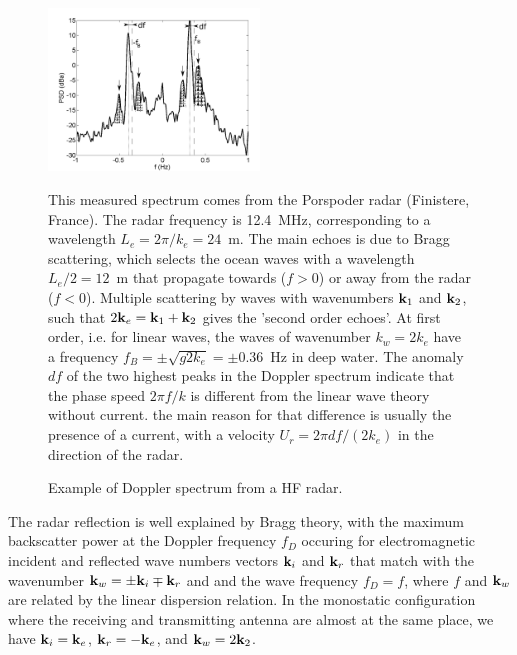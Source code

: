\begin{figure}[htb]
\centerline{\includegraphics[width=0.5\textwidth]{FIGS_CH_MEASUREMENTS/Spectre_bin_10_touch.png}}
  \caption{Example of Doppler spectrum from a HF radar.}{This measured spectrum comes from the Porspoder radar (Finistere, France). 
The radar frequency is 12.4~MHz, corresponding to a wavelength $L_e=2 \pi/k_e=24$~m. The main echoes is due to Bragg scattering, 
which selects the ocean waves with a wavelength $L_e/2=12$~m that propagate towards ($f > 0$)  or away from the radar ($f<0$). 
Multiple scattering by waves with wavenumbers  $\mathbf{k}_1$ and $\mathbf{k}_2$, such that $2 \mathbf{k}_e = \mathbf{k}_1 + \mathbf{k}_2$
gives the 'second order echoes'. At first order, i.e. for linear waves, the waves of wavenumber $k_w=2 k_e$ 
have a frequency $f_B=\pm \sqrt{g 2 k_e} =\pm 0.36$~Hz  in deep water. The anomaly $df$ of the two highest peaks in the Doppler spectrum 
indicate that the phase speed $2 \pi f / k$ is different from the linear wave theory without current. 
the main reason for that difference is usually the presence of a current, with a velocity $U_r=2 \pi df / (2 k_e)$ in the direction of the radar. }\label{HFspectrum}
\end{figure}

The radar reflection is well explained by Bragg theory, with the maximum backscatter power at the Doppler frequency $f_D$ occuring for 
electromagnetic incident and reflected wave numbers vectors $\mathbf{k}_i$ and $\mathbf{k}_r$ that match with the wavenumber $\mathbf{k}_w = \pm \mathbf{k}_i \mp \mathbf{k}_r$ 
and and the wave frequency $f_D=f$, where $f$ and $\mathbf{k}_w$ are related by the linear dispersion relation. 
In the monostatic configuration where the receiving and transmitting antenna are almost at the same place, we have $\mathbf{k}_i = \mathbf{k}_e$,  $\mathbf{k}_r= - \mathbf{k}_e$, 
and $\mathbf{k}_w = 2 \mathbf{k}_2$. 

